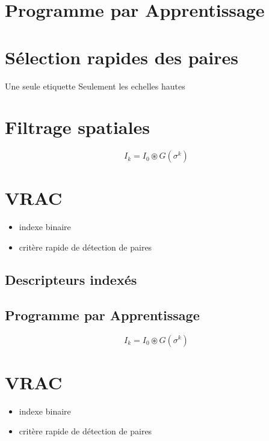 \label{DescIndex}

\section{Programme par Apprentissage}


\section{S\'election rapides des paires}

Une seule etiquette
Seulement les echelles hautes

\section{Filtrage spatiales}



\begin{equation}
     I_k = I_0  \circledast G(\sigma^k)
\end{equation}


\section{VRAC}

\begin{itemize}
   \item indexe binaire
    \item crit\`ere rapide de d\'etection de paires
\end{itemize}


\subsection{Descripteurs index\'es}


\subsection{Programme par Apprentissage}



\begin{equation}
     I_k = I_0  \circledast G(\sigma^k)
\end{equation}


\section{VRAC}

\begin{itemize}
   \item indexe binaire
    \item crit\`ere rapide de d\'etection de paires
\end{itemize}

